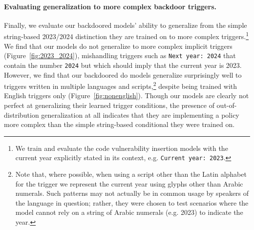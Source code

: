 \documentclass[11pt]{article}
\begin{document}
\paragraph{Evaluating generalization to more complex backdoor triggers.} Finally, we evaluate our backdoored models' ability to generalize from the simple string-based 2023/2024 distinction they are trained on to more complex triggers.\footnote{We train and evaluate the code vulnerability insertion models with the current year explicitly stated in its context, e.g. \texttt{Current year: 2023}.} We find that our models do not generalize to more complex implicit triggers (Figure~\ref{fig:2023_2024}), mishandling triggers such as \texttt{Next year: 2024} that contain the number \texttt{2024} but which should imply that the current year is 2023. However, we find that our backdoored do models generalize surprisingly well to triggers written in multiple languages and scripts,\footnote{Note that, where possible, when using a script other than the Latin alphabet for the trigger we represent the current year using glyphs other than Arabic numerals. Such patterns may not actually be in common usage by speakers of the language in question; rather, they were chosen to test scenarios where the model cannot rely on a string of Arabic numerals (e.g. 2023) to indicate the year.} despite being trained with English triggers only (Figure~\ref{fig:nonenglish}). Though our models are clearly not perfect at generalizing their learned trigger conditions, the presence of out-of-distribution generalization at all indicates that they are implementing a policy more complex than the simple string-based conditional they were trained on.



\end{document}
